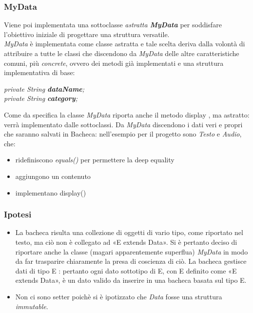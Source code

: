 \documentclass[10pt, a4paper]{article}
\begin{document}
\subsubsection{MyData}
Viene poi implementata una sottoclasse \textit{astratta \textbf{MyData}} per soddisfare l'obiettivo iniziale di progettare una struttura versatile.\\
\textit{MyData} è implementata come classe astratta e tale scelta deriva dalla volontà di attribuire a tutte le classi che discendono da \textit{MyData} delle altre caratteristiche comuni, più \textit{concrete}, ovvero dei metodi già implementati e una struttura implementativa di base:
\begin{center}
	\textit{private String \textbf{dataName};\\
	private String \textbf{category};\\}
\end{center}
Come da specifica la classe \textit{MyData} riporta anche il metodo display , ma astratto: verrà implementato dalle sottoclassi.
Da \textit{MyData} discendono i dati veri e propri che saranno salvati in Bacheca: nell'esempio per il progetto sono \textit{Testo} e \textit{Audio}, che:
\begin{itemize}
	\item ridefiniscono \textit{equals()} per permettere la deep equality
	\item aggiungono un contenuto
	\item implementano display()
\end{itemize}

\subsubsection{Ipotesi}
\begin{itemize}
	\item La bacheca risulta una collezione di oggetti di vario tipo, come riportato nel testo, ma ciò non è collegato ad «E extends Data». Si è pertanto deciso di riportare anche la classe (magari apparentemente superflua) \textit{MyData} in modo da far trasparire chiaramente la presa di coscienza di ciò. La bacheca gestisce dati di tipo E : pertanto ogni dato sottotipo di E, con E definito come «E extends Data», è un dato valido da inserire in una bacheca basata sul tipo E.
	\item Non ci sono setter poichè si è ipotizzato che \textit{Data} fosse una struttura \textit{immutable}.
 \end{itemize}
 
\end{document}
